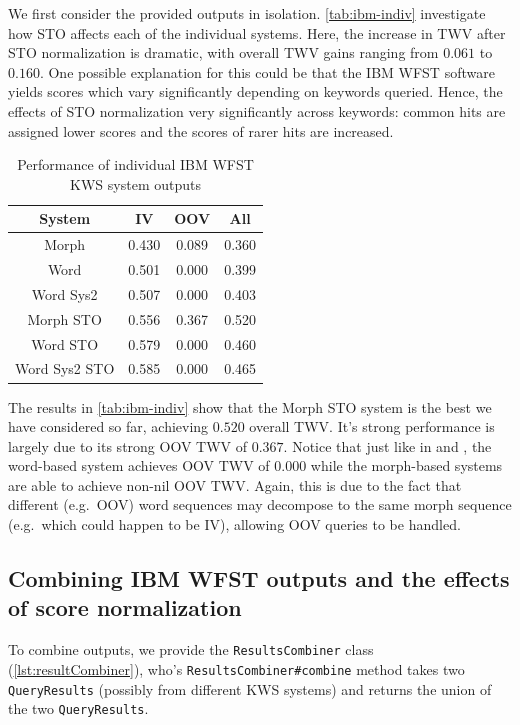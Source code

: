 \documentclass[a4paper,oneside,reqno]{amsart}
\begin{document}
We first consider the provided outputs in isolation.  \autoref{tab:ibm-indiv}
investigate how STO affects each of the individual systems.  Here, the increase
in TWV after STO normalization is dramatic, with overall TWV gains ranging from
$0.061$ to $0.160$. One possible explanation for this could be that the IBM
WFST software yields scores which vary significantly depending on keywords
queried. Hence, the effects of STO normalization very significantly across
keywords: common hits are assigned lower scores and the scores of rarer hits
are increased.

\begin{table}[ht!]
  \begin{tabular}{cccc}
    \toprule
    System        & IV    & OOV   & All \\
    \midrule
    Morph         & 0.430 & 0.089 & 0.360 \\
    Word          & 0.501 & 0.000 & 0.399 \\
    Word Sys2     & 0.507 & 0.000 & 0.403 \\
    \hline
    Morph STO     & 0.556 & 0.367 & 0.520 \\
    Word STO      & 0.579 & 0.000 & 0.460 \\
    Word Sys2 STO & 0.585 & 0.000 & 0.465 \\
    \bottomrule
  \end{tabular}
  \caption{Performance of individual IBM WFST KWS system outputs}
  \label{tab:ibm-indiv}
\end{table}

The results in \autoref{tab:ibm-indiv} show that the Morph STO system
is the best we have considered so far, achieving $0.520$ overall TWV\@.
It's strong performance is largely due to its strong OOV TWV of $0.367$.
Notice that just like in \label{tab:word} and \label{tab:morph}, the word-based
system achieves OOV TWV of $0.000$ while the morph-based systems are able to
achieve non-nil OOV TWV\@. Again, this is due to the fact that different (e.g.\
OOV) word sequences may decompose to the same morph sequence (e.g.\ which could
happen to be IV), allowing OOV queries to be handled.

\subsection{Combining IBM WFST outputs and the effects of score normalization}

To combine outputs, we provide the \texttt{ResultsCombiner} class (\autoref{lst:resultCombiner}),
who's \texttt{ResultsCombiner\#combine} method takes two \texttt{QueryResults} (possibly
from different KWS systems) and returns the union of the two \texttt{QueryResults}.
\end{document}
